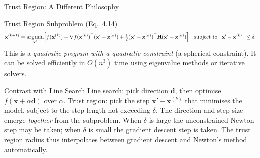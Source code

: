 \documentclass[aspectratio=169,10pt]{beamer}
\newcommand{\bx}{\mathbf{x}}
\newcommand{\bd}{\mathbf{d}}
\newcommand{\bH}{\mathbf{H}}
\newcommand{\grad}{\nabla}
\begin{document}
\begin{frame}[allowframebreaks]{Trust Region: A Different Philosophy}
  \framebreak

  \begin{block}{Trust Region Subproblem (Eq.\ 4.14)}
    \[
      \bx^{(k+1)}
      = \operatorname*{arg\,min}_{\bx'}
      \Bigl[
        f(\bx^{(k)})
        + \grad f(\bx^{(k)})^{\top}(\bx'-\bx^{(k)})
        + \tfrac{1}{2}(\bx'-\bx^{(k)})^{\top}\bH(\bx'-\bx^{(k)})
      \Bigr]
      \quad
      \text{subject to } \|\bx' - \bx^{(k)}\| \le \delta.
    \]
    This is a \emph{quadratic program with a quadratic constraint} (a
    spherical constraint).  It can be solved efficiently in $O(n^3)$
    time using eigenvalue methods or iterative solvers.
  \end{block}

  \begin{alertblock}{Contrast with Line Search}
    Line search: pick direction $\bd$, then optimise $f(\bx + \alpha\bd)$
    over $\alpha$.  Trust region: pick the step $\bx' - \bx^{(k)}$ that
    minimises the model, subject to the step length not exceeding $\delta$.
    The direction and step size emerge \emph{together} from the
    subproblem.  When $\delta$ is large the unconstrained Newton step
    may be taken; when $\delta$ is small the gradient descent step is
    taken.  The trust region radius thus interpolates between gradient
    descent and Newton's method automatically.
  \end{alertblock}

\end{frame}
\end{document}
